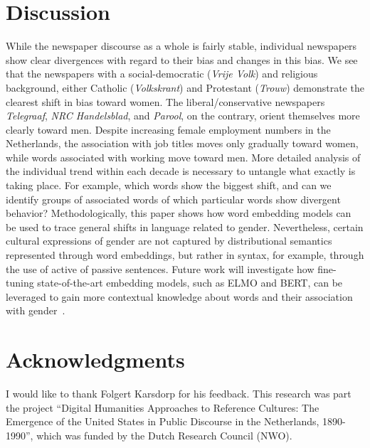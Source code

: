 \documentclass[11pt,a4paper]{article}
\begin{document}
\section{Discussion}
While the newspaper discourse as a whole is fairly stable, individual newspapers show clear divergences with regard to their bias and changes in this bias. We see that the newspapers with a social-democratic (\textit{Vrije Volk}) and religious background, either Catholic (\textit{Volkskrant}) and Protestant (\textit{Trouw}) demonstrate the clearest shift in bias toward women. The liberal/conservative newspapers \textit{Telegraaf}, \textit{NRC Handelsblad}, and \textit{Parool}, on the contrary, orient themselves more clearly toward men. 
Despite increasing female employment numbers in the Netherlands, the association with job titles moves only gradually toward women, while words associated with working move toward men. 
More detailed analysis of the individual trend within each decade is necessary to untangle what exactly is taking place. For example, which words show the biggest shift, and can we identify groups of associated words of which particular words show divergent behavior?
Methodologically, this paper shows how word embedding models can be used to trace general shifts in language related to gender. Nevertheless, certain cultural expressions of gender are not captured by distributional semantics represented through word embeddings, but rather in syntax, for example, through the use of active of passive sentences. Future work will investigate how fine-tuning state-of-the-art embedding models, such as ELMO and BERT, can be leveraged to gain more contextual knowledge about words and their association with gender~\cite{peters_deep_2018}.  


\section*{Acknowledgments}
I would like to thank Folgert Karsdorp for his feedback. This research was part the project ``Digital Humanities Approaches to Reference Cultures: The Emergence of the United States in Public Discourse in the Netherlands, 1890-1990'', which was funded by the Dutch Research Council (NWO).\\



\end{document}

